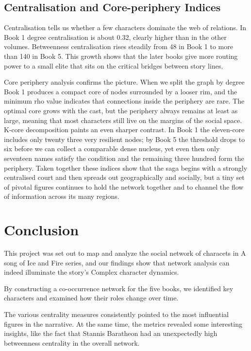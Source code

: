 \documentclass[12pt, a4paper]{article}
\begin{document}
\subsection*{Centralisation and Core-periphery Indices}
Centralisation tells us whether a few characters dominate the web of relations. In Book 1 degree centralisation is about 0.32, clearly higher than in the other volumes. Betweenness centralisation rises steadily from 48 in Book 1 to more than 140 in Book 5. This growth shows that the later books give more routing power to a small elite that sits on the critical bridges between story lines.

Core periphery analysis confirms the picture. 
When we split the graph by degree Book 1 produces a compact core of nodes surrounded by a looser rim, and the minimum rho value indicates that connections inside the periphery are rare. The optimal core grows with the cast, but the periphery always remains at least as large, meaning that most characters still live on the margins of the social space. 
K-core decomposition paints an even sharper contrast. 
In Book 1 the eleven-core includes only twenty three very resilient nodes; by Book 5 the threshold drops to six before we can collect a comparable dense nucleus, yet even then only seventeen names satisfy the condition and the remaining three hundred form the periphery. Taken together these indices show that the saga begins with a strongly centralised court and then spreads out geographically and socially, but a tiny set of pivotal figures continues to hold the network together and to channel the flow of information across its many regions.
  
\section{Conclusion}
\label{conclusion}

This project was set out to map and analyze the social network of characets in A song of Ice and Fire series, and our findings show that network analysis can indeed illuminate the story's Complex character dynamics.

By constructing a co-occurrence network for the five books, we identified key characters and examined how their roles change over time.

The various centrality measures consistently pointed to the most influential figures in the narrative.  At the same time, the metrics revealed some interesting insights, like the fact that Stannis Baratheon had an unexpectedly high betweenness centrality in the overall network.
\end{document}
